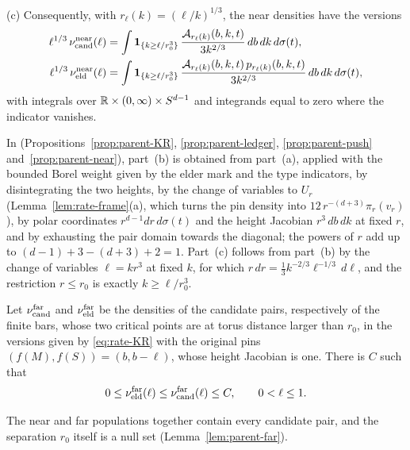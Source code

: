 \begin{hypothesis}
\textup{(c)} Consequently, with $r_\ell(k)=(\ell/k)^{1/3}$, the near densities have the versions
\begin{align}
\ell^{1/3}\,\nu^{\rm near}_{\mathrm{cand}}(\ell)&=\int\mathbf 1_{\{k\ge\ell/r_0^3\}}\,\frac{\mathcal A_{r_\ell(k)}(b,k,t)}{3k^{2/3}}\,db\,dk\,d\sigma(t),\label{eq:rate-near-cand}\\
\ell^{1/3}\,\nu^{\rm near}_{\mathrm{eld}}(\ell)&=\int\mathbf 1_{\{k\ge\ell/r_0^3\}}\,\frac{\mathcal A_{r_\ell(k)}(b,k,t)\,p_{r_\ell(k)}(b,k,t)}{3k^{2/3}}\,db\,dk\,d\sigma(t),\label{eq:rate-near-eld}
\end{align}
with integrals over $\mathbb R\times(0,\infty)\times S^{d-1}$ and integrands equal to zero where the indicator vanishes.
\end{hypothesis}

In \cite{parentP} (Propositions~\ref{prop:parent-KR}, \ref{prop:parent-ledger}, \ref{prop:parent-push} and~\ref{prop:parent-near}), part~(b) is obtained from part~(a), applied with the bounded Borel weight given by the elder mark and the type indicators, by disintegrating the two heights, by the change of variables to $U_r$ (Lemma~\ref{lem:rate-frame}(a), which turns the pin density into $12\,r^{-(d+3)}\pi_r(v_r)$), by polar coordinates $r^{d-1}dr\,d\sigma(t)$ and the height Jacobian $r^3\,db\,dk$ at fixed $r$, and by exhausting the pair domain towards the diagonal; the powers of $r$ add up to $(d-1)+3-(d+3)+2=1$. Part~(c) follows from part~(b) by the change of variables $\ell=kr^3$ at fixed $k$, for which $r\,dr=\tfrac13k^{-2/3}\ell^{-1/3}\,d\ell$, and the restriction $r\le r_0$ is exactly $k\ge\ell/r_0^3$.

\begin{hypothesis}\label{hyp:rate-far}
Let $\nu^{\rm far}_{\mathrm{cand}}$ and $\nu^{\rm far}_{\mathrm{eld}}$ be the densities of the candidate pairs, respectively of the finite bars, whose two critical points are at torus distance larger than $r_0$, in the versions given by \eqref{eq:rate-KR} with the original pins $(f(M),f(S))=(b,b-\ell)$, whose height Jacobian is one. There is $C$ such that
\begin{equation}\label{eq:rate-far}
0\le\nu^{\rm far}_{\mathrm{eld}}(\ell)\le\nu^{\rm far}_{\mathrm{cand}}(\ell)\le C,\qquad 0<\ell\le1 .
\end{equation}
\end{hypothesis}

The near and far populations together contain every candidate pair, and the separation $r_0$ itself is a null set \cite[\S14]{parentP} (Lemma~\ref{lem:parent-far}).

